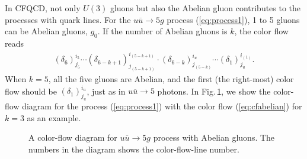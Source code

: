 In CFQCD, not only $U(3)$ gluons but also the Abelian gluon
contributes to the processes with quark lines. For the
$u\overline{u}\rightarrow 5g$ process (\ref{eq:process1}), 1 to 5
gluons can be Abelian gluons, $g_0$. If the number of Abelian
gluons is $k$, the color flow reads
\begin{align}
 (\delta_6)_{j_5}^{i_5}\cdots
 (\delta_{6-k+1})_{j_{(5-k+1)}}^{i_{(5-k+1)}}\cdot
 (\delta_{6-k})_{j_{(5-k)}}^{i_u}\cdots (\delta_1)_{j_u}^{i_{(1)}}.
 \label{eq:cfabelian}
\end{align}
When $k=5$, all the five gluons are Abelian, and the first (the right-most)
color flow should be $(\delta_1)_{j_u}^{i_u}$, just as in
$u\overline{u}\rightarrow 5$ photons. In Fig.\,\ref{fig:qqbar3g0cf}, we
show the color-flow diagram for the process (\ref{eq:process1}) with
the color flow (\ref{eq:cfabelian}) for $k=3$ as an
 example.
\begin{figure}
\caption{A color-flow diagram for $u\overline{u}\rightarrow
 5g$ process with Abelian gluons. The numbers in the diagram shows
 the
 color-flow-line number.}
\label{fig:qqbar3g0cf}
\end{figure}

